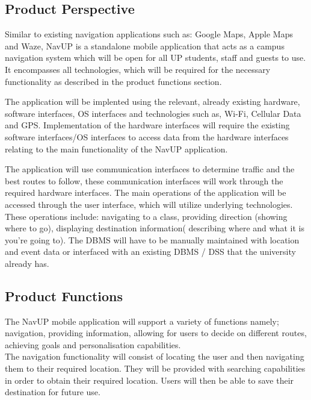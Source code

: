 \documentclass[11pt, a4paper]{article}
\begin{document}
	\subsection{Product Perspective}
	Similar to existing navigation applications such as: Google Maps,  Apple Maps and Waze,  NavUP is a standalone mobile application that acts as a campus navigation system which will be open for all UP students,  staff and guests to use. It encompasses all technologies,  which will be required for the necessary functionality as described in the product functions section. 
	\\
	\par
The application will be implented using the relevant,   already existing hardware,   software interfaces,  OS interfaces and technologies such as,  Wi-Fi,  Cellular Data and GPS. Implementation of the hardware interfaces will require the  existing software interfaces/OS interfaces to access data from the hardware interfaces relating to the main functionality of the NavUP application. 
	\\
	\par
The application will use communication interfaces to determine traffic and the best routes to follow,  these communication interfaces will work through the required hardware interfaces. The main operations of the application will be accessed through the user interface,  which will utilize underlying  technologies. These operations include: navigating to a class,   providing direction (showing where to go), displaying destination information( describing where and what it is you're going to). The DBMS will have to be manually maintained with location and event data or interfaced with an existing DBMS / DSS that the university already has. 

	\subsection{Product Functions}
	The NavUP mobile application will support a variety of functions namely; navigation,  providing information,  allowing for users to decide on different routes,  achieving goals and personalisation capabilities.
	\\

	The navigation functionality will consist of locating the user and then navigating them to their required location. They will be provided with searching capabilities in order to obtain their required location. Users will then be able to save their destination for future use.
	\\
\end{document}
